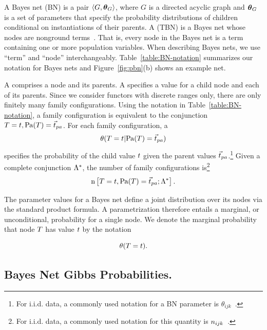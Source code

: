 \documentclass[twoside,11pt]{article}
\newcommand{\iid}{i.i.d.}
\begin{document}
A Bayes net (BN) is a pair
$\langle{G,\boldsymbol{\theta}_G}\rangle$, where $G$ is a directed acyclic graph and $\boldsymbol{\theta}_G$ is a set of parameters that specify the  probability distributions of children conditional on instantiations of their parents. A  (TBN) is a Bayes net whose nodes are nonground terms~\cite{Poole2003,Schulte2011}. That is, every node in the Bayes net is a term containing one or more population variables. When describing Bayes nets, we use ``term'' and ``node'' interchangeably. Table~\ref{table:BN-notation} summarizes our notation for Bayes nets and Figure~\ref{fig:pbn}(b) shows an example net.

A  comprises a node and its parents. A  specifies a value for a child node and each of its parents. Since we consider functors with discrete ranges only, there are only finitely many family configurations. Using the notation in Table~\ref{table:BN-notation}, a family configuration is equivalent to the conjunction $\TT=\TV,\Pa{\TT} = \Prange{\TT}$. For each family configuration, a  $$\cprob{\TT = \TV}{\Pa{\TT} = \Prange{\TT}}$$ specifies the probability of the child value $t$ given the parent values $\Prange{\TT}$.\footnote{For \iid{} data, a commonly  used notation for a BN parameter is $\theta_{ijk}$~\cite{Heckerman1998}.} Given a complete conjunction $\Lambda^{*}\hspace{0.0ex}$, the number of family configurations is\footnote{For \iid{} data, a commonly  used notation for this quantity is $n_{ijk}$~\cite{Heckerman1998}.} $$\Count{\TT=\TV,\Pa{\TT} = \Prange{\TT}}{\DB}.$$

The parameter values for a Bayes net define a joint distribution over its nodes via the standard product formula. A parametrization therefore entails a marginal, or unconditional, probability for a single node. We denote the marginal probability that node $T$ has value $t$ by the notation

$$\theta(T = t).$$


\subsection{Bayes Net Gibbs Probabilities.}
\end{document}
